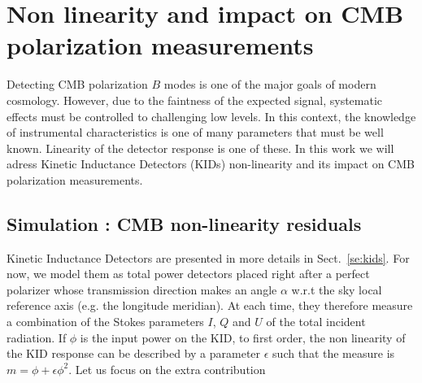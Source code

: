 
\section{Non linearity and impact on CMB polarization measurements}
\label{sec:cmb}



Detecting CMB polarization $B$ modes is one of the major goals of modern
cosmology. However, due to the faintness of the expected signal, systematic
effects must be controlled to challenging low levels. In this context, the
knowledge of instrumental characteristics is one of many parameters that must be
well known. Linearity of the detector response is one of these. In this work we will adress Kinetic Inductance Detectors (KIDs) non-linearity and its impact on CMB polarization measurements.

\subsection{Simulation : CMB non-linearity residuals}

Kinetic Inductance Detectors are presented in more details in Sect.~\ref{se:kids}. For now, we model
them as total power detectors placed right after a perfect polarizer whose
transmission direction makes an angle $\alpha$ w.r.t the sky local reference
axis (e.g. the longitude meridian). At each time, they therefore measure a
combination of the Stokes parameters $I$, $Q$ and $U$ of the total incident
radiation. If $\phi$ is the input power on the KID, to first order, the non
linearity of the KID response can be described by a parameter $\epsilon$ such
that the measure is $m=\phi + \epsilon\phi^2$. Let us focus on the
extra contribution

